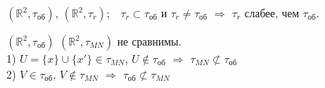 \documentclass[11pt,fleqn]{book} %
\begin{document}
\begin{example}
$(\mathbb{R}^2,\tau_{\text{об}})$, $(\mathbb{R}^2,\tau_{r})$;\ \ 
$\tau_{r}{\subset}\tau_{\text{об}}$ и $\tau_{r}{\neq}\tau_{\text{об}}$ $\Rightarrow$ $\tau_r$ слабее, чем $\tau_{\text{об}}$.
\end{example}

\begin{example}
$(\mathbb{R}^2,\tau_{\text{об}})$ $(\mathbb{R}^2,\tau_{MN})$ не сравнимы.\\
1) $U=\{x\}{\cup}\{x'\}{\in}\tau_{MN}$, $U{\notin}\tau_{\text{об}}$ $\Rightarrow$ $\tau_{MN}{\not\subset}\tau_{\text{об}}$\\
2) $V{\in}\tau_{\text{об}}$, $V{\notin}\tau_{MN}$ $\Rightarrow$ $\tau_{\text{об}}{\not\subset}\tau_{MN}$
\end{example}
\end{document}
